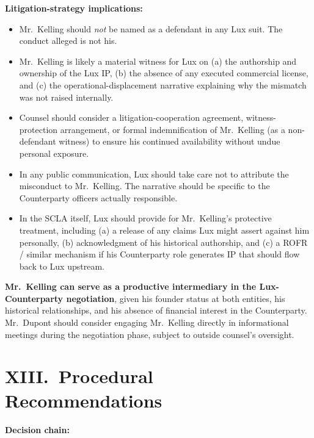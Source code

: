 \documentclass[11pt,letterpaper]{article}
\begin{document}
\textbf{Litigation-strategy implications:}

\begin{itemize}[leftmargin=1.5em,itemsep=0.1em]
\item Mr.\ Kelling should \emph{not} be named as a defendant in any
Lux suit. The conduct alleged is not his.
\item Mr.\ Kelling is likely a material witness for Lux on (a) the
authorship and ownership of the Lux IP, (b) the absence of any
executed commercial license, and (c) the operational-displacement
narrative explaining why the mismatch was not raised internally.
\item Counsel should consider a litigation-cooperation agreement,
witness-protection arrangement, or formal indemnification of Mr.\
Kelling (as a non-defendant witness) to ensure his continued
availability without undue personal exposure.
\item In any public communication, Lux should take care not to
attribute the misconduct to Mr.\ Kelling. The narrative should be
specific to the Counterparty officers actually responsible.
\item In the SCLA itself, Lux should provide for Mr.\ Kelling's
protective treatment, including (a) a release of any claims Lux
might assert against him personally, (b) acknowledgment of his
historical authorship, and (c) a ROFR / similar mechanism if his
Counterparty role generates IP that should flow back to Lux upstream.
\end{itemize}

\textbf{Mr.\ Kelling can serve as a productive intermediary in the
Lux-Counterparty negotiation}, given his founder status at both
entities, his historical relationships, and his absence of financial
interest in the Counterparty. Mr.\ Dupont should consider engaging
Mr.\ Kelling directly in informational meetings during the
negotiation phase, subject to outside counsel's oversight.

\section*{XIII.\ Procedural Recommendations}

\textbf{Decision chain:}
\end{document}
